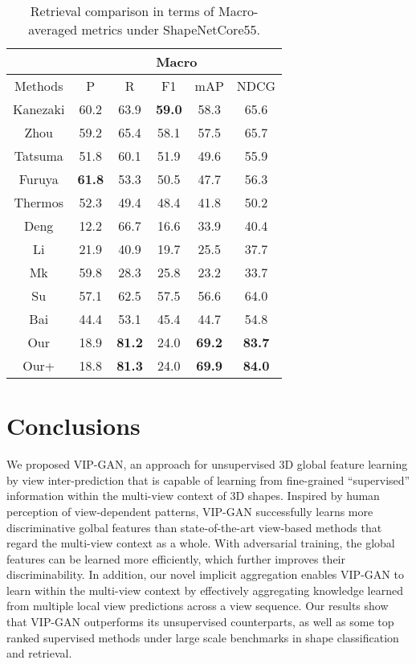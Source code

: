 \documentclass[letterpaper]{article} \usepackage{aaai19}  \usepackage{times}  \usepackage{helvet}  \usepackage{courier}  \usepackage{url}  \usepackage{graphicx}
\begin{document}
\begin{table}[htb]
\centering
\caption{Retrieval comparison in terms of Macro-averaged metrics under ShapeNetCore55.}  \begin{tabular}{c|c|c|c|c|c}  \hline
        & \multicolumn{5}{|c}{Macro} \\
     \hline
       Methods & P & R & F1 & mAP & NDCG  \\  \hline
Kanezaki & 60.2 & 63.9 & \textbf{59.0} & 58.3 & 65.6 \\
       Zhou & 59.2 & 65.4 & 58.1 & 57.5& 65.7\\
       Tatsuma  & 51.8 & 60.1 & 51.9 & 49.6 & 55.9 \\
       Furuya  & \textbf{61.8} & 53.3 & 50.5 & 47.7 & 56.3\\
       Thermos  & 52.3 & 49.4 & 48.4 & 41.8 & 50.2\\
       Deng  & 12.2 & 66.7 & 16.6 & 33.9 & 40.4\\
       Li  & 21.9 & 40.9 & 19.7 & 25.5 & 37.7\\
       Mk  & 59.8 & 28.3 & 25.8 & 23.2 & 33.7\\
       Su  & 57.1 & 62.5 & 57.5 & 56.6 & 64.0 \\
       Bai  & 44.4 & 53.1 & 45.4 & 44.7 & 54.8\\
       Our  & 18.9 & \textbf{81.2} & 24.0 & \textbf{69.2} & \textbf{83.7} \\Our+  & 18.8 & \textbf{81.3} & 24.0 & \textbf{69.9} & \textbf{84.0} \\\hline
   \end{tabular}
   \label{table:t11}
\end{table}





\section{Conclusions }
We proposed VIP-GAN, an approach for unsupervised 3D global feature learning by view inter-prediction that is capable of learning from fine-grained ``supervised'' information within the multi-view context of 3D shapes. Inspired by human perception of view-dependent patterns, VIP-GAN successfully learns more discriminative golbal features than state-of-the-art view-based methods that regard the multi-view context as a whole. With adversarial training, the global features can be learned more efficiently, which further improves their discriminability. In addition, our novel implicit aggregation enables VIP-GAN to learn within the multi-view context by effectively aggregating knowledge learned from multiple local view predictions across a view sequence. Our results show that VIP-GAN outperforms its unsupervised counterparts, as well as some top ranked supervised methods under large scale benchmarks in shape classification and retrieval.
\end{document}
